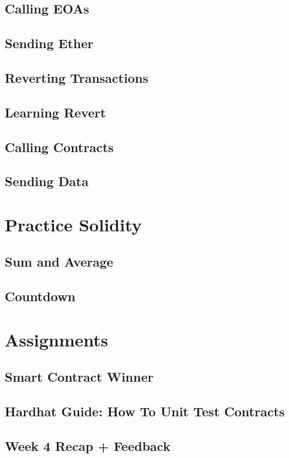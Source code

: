 \documentclass[a4paper, oneside]{book}
\begin{document}
\subsection{Calling EOAs}
\subsection{Sending Ether}
\subsection{Reverting Transactions}
\subsection{Learning Revert}
\subsection{Calling Contracts}
\subsection{Sending Data}

\section{Practice Solidity}
\subsection{Sum and Average}
\subsection{Countdown}

\section{Assignments}
\subsection{Smart Contract Winner}
\subsection{Hardhat Guide: How To Unit Test Contracts}
\subsection{Week 4 Recap + Feedback}
\end{document}
